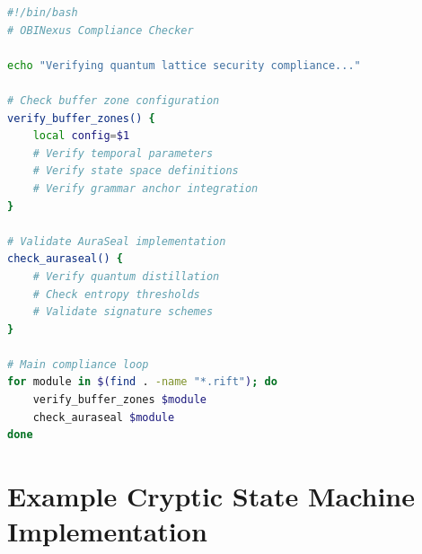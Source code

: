 \documentclass[12pt,a4paper]{article}
\begin{document}
\begin{lstlisting}[language=bash,caption=Compliance Verification Script]
#!/bin/bash
# OBINexus Compliance Checker

echo "Verifying quantum lattice security compliance..."

# Check buffer zone configuration
verify_buffer_zones() {
    local config=$1
    # Verify temporal parameters
    # Verify state space definitions
    # Verify grammar anchor integration
}

# Validate AuraSeal implementation
check_auraseal() {
    # Verify quantum distillation
    # Check entropy thresholds
    # Validate signature schemes
}

# Main compliance loop
for module in $(find . -name "*.rift"); do
    verify_buffer_zones $module
    check_auraseal $module
done
\end{lstlisting}

\appendix
\section{Example Cryptic State Machine Implementation}
\end{document}
